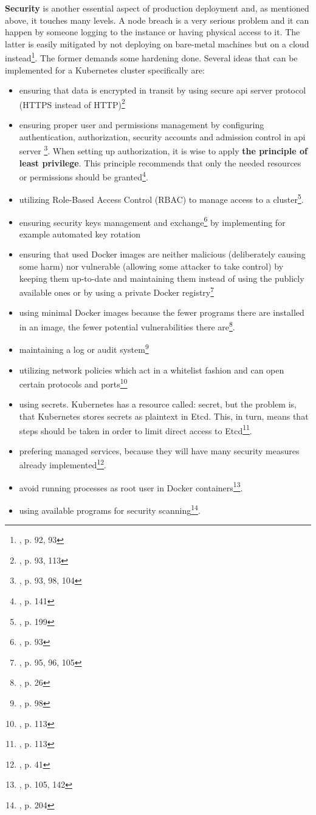\textbf{Security} is another essential aspect of production deployment and, as mentioned above, it touches many levels. A node breach is a very serious problem and it can happen by someone logging to the instance or having physical access to it. The latter is easily mitigated by not deploying on bare-metal machines but on a cloud instead\footnote{\cite{book-mastering-k8s}, p. 92, 93}. The former demands some hardening done. Several ideas that can be implemented for a Kubernetes cluster specifically are:
\begin{itemize}
\item ensuring that data is encrypted in transit by using secure api server protocol (HTTPS instead of HTTP)\footnote{\cite{book-mastering-k8s}, p. 93, 113}
\item ensuring proper user and permissions management by configuring authentication, authorization, security accounts and admission control in api server \footnote{\cite{book-mastering-k8s}, p. 93, 98, 104}. When setting up authorization, it is wise to apply \textbf{the principle of least privilege}. This principle recommends that only the needed resources or permissions should be granted\footnote{\cite{book-cndwk}, p. 141}.
\item utilizing Role-Based Access Control (RBAC) to manage access to a cluster\footnote{\cite{book-cndwk}, p. 199}.
\item ensuring security keys management and exchange\footnote{\cite{book-mastering-k8s}, p. 93} by implementing for example automated key rotation
\item ensuring that used Docker images are neither malicious (deliberately causing some harm) nor vulnerable (allowing some attacker to take control) by keeping them up-to-date and maintaining them instead of using the publicly available ones or by using a private Docker registry\footnote{\cite{book-mastering-k8s}, p. 95, 96, 105}
\item using minimal Docker images because the fewer programs there are installed in an image, the fewer potential vulnerabilities there are\footnote{\cite{book-cndwk}, p. 26}.
\item maintaining a log or audit system\footnote{\cite{book-mastering-k8s}, p. 98}
\item utilizing network policies which act in a whitelist fashion and can open certain protocols and ports\footnote{\cite{book-mastering-k8s}, p. 113}
\item using secrets. Kubernetes has a resource called: secret, but the problem is, that Kubernetes stores secrets as plaintext in Etcd. This, in turn, means that steps should be taken in order to limit direct access to Etcd\footnote{\cite{book-mastering-k8s}, p. 113}.
\item prefering managed services, because they will have many security measures already implemented\footnote{\cite{book-cndwk}, p. 41}.
\item avoid running processes as root user in Docker containers\footnote{\cite{book-cndwk}, p. 105, 142}.
\item using available programs for security scanning\footnote{\cite{book-cndwk}, p. 204}.
\end{itemize}

